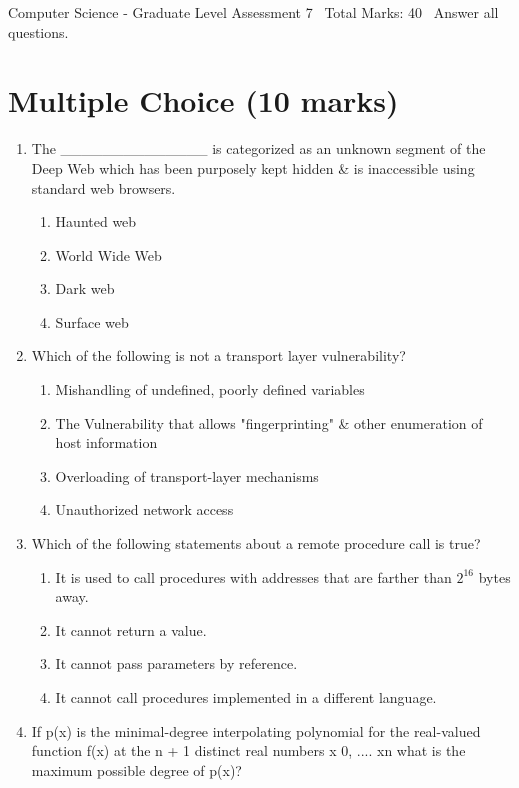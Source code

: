 \documentclass[12pt]{article}
\begin{document}
\begin{center}
Computer Science - Graduate Level Assessment 7 \
Total Marks: 40 \
Answer all questions.
\end{center}

\section*{Multiple Choice (10 marks)}
\begin{enumerate}[label=\arabic*.]
\item The \_\_\_\_\_\_\_\_\_\_\_\_\_\_ is categorized as an unknown segment of the Deep Web which has been purposely kept hidden \& is inaccessible using standard web browsers.
\begin{enumerate}[label=(\alph*)]
    \item Haunted web
    \item World Wide Web
    \item Dark web
    \item Surface web
\end{enumerate}
\item Which of the following is not a transport layer vulnerability?
\begin{enumerate}[label=(\alph*)]
    \item Mishandling of undefined, poorly defined variables
    \item The Vulnerability that allows "fingerprinting" \& other enumeration of host information
    \item Overloading of transport-layer mechanisms
    \item Unauthorized network access
\end{enumerate}
\item Which of the following statements about a remote procedure call is true?
\begin{enumerate}[label=(\alph*)]
    \item It is used to call procedures with addresses that are farther than $2^16$ bytes away.
    \item It cannot return a value.
    \item It cannot pass parameters by reference.
    \item It cannot call procedures implemented in a different language.
\end{enumerate}
\item If p(x) is the minimal-degree interpolating polynomial for the real-valued function f(x) at the n + 1 distinct real numbers x 0, .... xn what is the maximum possible degree of p(x)?

\end{enumerate}
\end{document}
